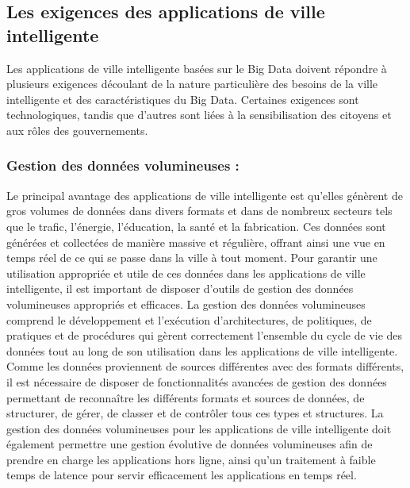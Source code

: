 \documentclass[french, a4paper, 12pt]{report}
\begin{document}
\subsection{Les exigences des applications de ville intelligente}
Les applications de ville intelligente basées sur le Big Data doivent répondre à plusieurs exigences découlant de la nature particulière des besoins de la ville intelligente et des caractéristiques du Big Data. Certaines exigences sont technologiques, tandis que d’autres sont liées à la sensibilisation des citoyens et aux rôles des gouvernements.\\
\subsubsection{Gestion des données volumineuses : }
Le principal avantage des applications de ville intelligente est qu’elles génèrent de gros volumes de données dans divers formats et dans de nombreux secteurs tels que le trafic, l’énergie, l’éducation, la santé et la fabrication. Ces données sont générées et collectées de manière massive et régulière, offrant ainsi une vue en temps réel de ce qui se passe dans la ville à tout moment. Pour garantir une utilisation appropriée et utile de ces données dans les applications de ville intelligente, il est important de disposer d'outils de gestion des données volumineuses appropriés et efficaces. La gestion des données volumineuses comprend le développement et l'exécution d'architectures, de politiques, de pratiques et de procédures qui gèrent correctement l'ensemble du cycle de vie des données tout au long de son utilisation dans les applications de ville intelligente. Comme les données proviennent de sources différentes avec des formats différents, il est nécessaire de disposer de fonctionnalités avancées de gestion des données permettant de reconnaître les différents formats et sources de données, de structurer, de gérer, de classer et de contrôler tous ces types et structures. La gestion des données volumineuses pour les applications de ville intelligente doit également permettre une gestion évolutive de données volumineuses afin de prendre en charge les applications hors ligne, ainsi qu'un traitement à faible temps de latence pour servir efficacement les applications en temps réel.\\
\end{document}

